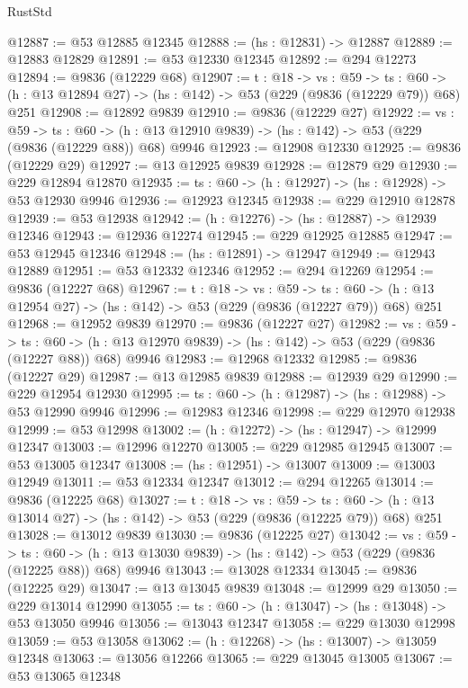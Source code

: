\begin{lexlean}{RustStd}
\begin{coremodule}
@12887 := @53 @12885 @12345
@12888 := (hs : @12831) -> @12887
@12889 := @12883 @12829
@12891 := @53 @12330 @12345
@12892 := @294 @12273
@12894 := @9836 (@12229 @68)
@12907 := {t : @18} ->
  {vs : @59} ->
  {ts : @60} -> (h : @13 @12894 @27) -> (hs : @142) -> @53 (@229 (@9836 (@12229 @79)) @68) @251
@12908 := @12892 @9839
@12910 := @9836 (@12229 @27)
@12922 := {vs : @59} ->
  {ts : @60} -> (h : @13 @12910 @9839) -> (hs : @142) -> @53 (@229 (@9836 (@12229 @88)) @68) @9946
@12923 := @12908 @12330
@12925 := @9836 (@12229 @29)
@12927 := @13 @12925 @9839
@12928 := @12879 @29
@12930 := @229 @12894 @12870
@12935 := {ts : @60} -> (h : @12927) -> (hs : @12928) -> @53 @12930 @9946
@12936 := @12923 @12345
@12938 := @229 @12910 @12878
@12939 := @53 @12938
@12942 := (h : @12276) -> (hs : @12887) -> @12939 @12346
@12943 := @12936 @12274
@12945 := @229 @12925 @12885
@12947 := @53 @12945 @12346
@12948 := (hs : @12891) -> @12947
@12949 := @12943 @12889
@12951 := @53 @12332 @12346
@12952 := @294 @12269
@12954 := @9836 (@12227 @68)
@12967 := {t : @18} ->
  {vs : @59} ->
  {ts : @60} -> (h : @13 @12954 @27) -> (hs : @142) -> @53 (@229 (@9836 (@12227 @79)) @68) @251
@12968 := @12952 @9839
@12970 := @9836 (@12227 @27)
@12982 := {vs : @59} ->
  {ts : @60} -> (h : @13 @12970 @9839) -> (hs : @142) -> @53 (@229 (@9836 (@12227 @88)) @68) @9946
@12983 := @12968 @12332
@12985 := @9836 (@12227 @29)
@12987 := @13 @12985 @9839
@12988 := @12939 @29
@12990 := @229 @12954 @12930
@12995 := {ts : @60} -> (h : @12987) -> (hs : @12988) -> @53 @12990 @9946
@12996 := @12983 @12346
@12998 := @229 @12970 @12938
@12999 := @53 @12998
@13002 := (h : @12272) -> (hs : @12947) -> @12999 @12347
@13003 := @12996 @12270
@13005 := @229 @12985 @12945
@13007 := @53 @13005 @12347
@13008 := (hs : @12951) -> @13007
@13009 := @13003 @12949
@13011 := @53 @12334 @12347
@13012 := @294 @12265
@13014 := @9836 (@12225 @68)
@13027 := {t : @18} ->
  {vs : @59} ->
  {ts : @60} -> (h : @13 @13014 @27) -> (hs : @142) -> @53 (@229 (@9836 (@12225 @79)) @68) @251
@13028 := @13012 @9839
@13030 := @9836 (@12225 @27)
@13042 := {vs : @59} ->
  {ts : @60} -> (h : @13 @13030 @9839) -> (hs : @142) -> @53 (@229 (@9836 (@12225 @88)) @68) @9946
@13043 := @13028 @12334
@13045 := @9836 (@12225 @29)
@13047 := @13 @13045 @9839
@13048 := @12999 @29
@13050 := @229 @13014 @12990
@13055 := {ts : @60} -> (h : @13047) -> (hs : @13048) -> @53 @13050 @9946
@13056 := @13043 @12347
@13058 := @229 @13030 @12998
@13059 := @53 @13058
@13062 := (h : @12268) -> (hs : @13007) -> @13059 @12348
@13063 := @13056 @12266
@13065 := @229 @13045 @13005
@13067 := @53 @13065 @12348

\end{coremodule}
\end{lexlean}
